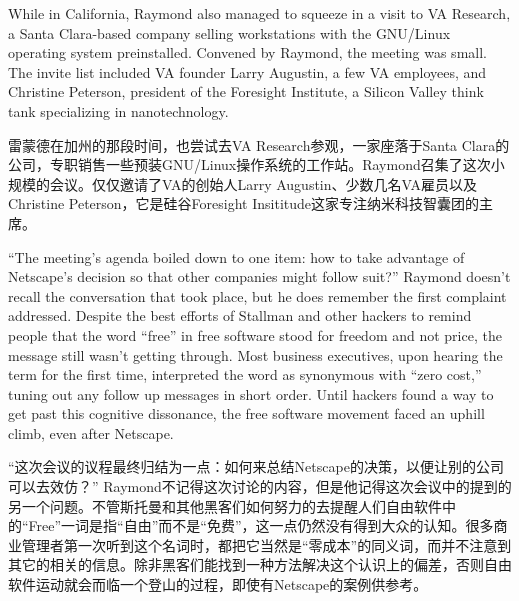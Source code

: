 
\ifdefined\eng
While in California, Raymond also managed to squeeze in a visit to VA Research, a Santa Clara-based company selling workstations with the GNU/Linux operating system preinstalled. Convened by Raymond, the meeting was small. The invite list included VA founder Larry Augustin, a few VA employees, and Christine Peterson, president of the Foresight Institute, a Silicon Valley think tank specializing in nanotechnology.
\fi

\ifdefined\chs
雷蒙德在加州的那段时间，也尝试去VA Research参观，一家座落于Santa Clara的公司，专职销售一些预装GNU/Linux操作系统的工作站。Raymond召集了这次小规模的会议。仅仅邀请了VA的创始人Larry Augustin、少数几名VA雇员以及Christine Peterson，它是硅谷Foresight Insititude这家专注纳米科技智囊团的主席。
\fi

\ifdefined\eng
``The meeting's agenda boiled down to one item: how to take advantage of Netscape's decision so that other companies might follow suit?'' Raymond doesn't recall the conversation that took place, but he does remember the first complaint addressed. Despite the best efforts of Stallman and other hackers to remind people that the word ``free'' in free software stood for freedom and not price, the message still wasn't getting through. Most business executives, upon hearing the term for the first time, interpreted the word as synonymous with ``zero cost,'' tuning out any follow up messages in short order. Until hackers found a way to get past this cognitive dissonance, the free software movement faced an uphill climb, even after Netscape.
\fi

\ifdefined\chs
``这次会议的议程最终归结为一点：如何来总结Netscape的决策，以便让别的公司可以去效仿？'' Raymond不记得这次讨论的内容，但是他记得这次会议中的提到的另一个问题。不管斯托曼和其他黑客们如何努力的去提醒人们自由软件中的``Free''一词是指``自由''而不是``免费''，这一点仍然没有得到大众的认知。很多商业管理者第一次听到这个名词时，都把它当然是``零成本''的同义词，而并不注意到其它的相关的信息。除非黑客们能找到一种方法解决这个认识上的偏差，否则自由软件运动就会而临一个登山的过程，即使有Netscape的案例供参考。
\fi



